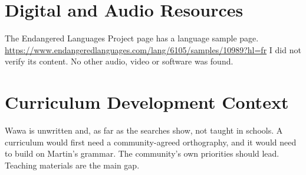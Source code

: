 \documentclass[12pt]{article}
\begin{document}
\section{Digital and Audio Resources}
The Endangered Languages Project page has a language sample page. \url{https://www.endangeredlanguages.com/lang/6105/samples/10989?hl=fr} I did not verify its content. No other audio, video or software was found.

\section{Curriculum Development Context}
Wawa is unwritten and, as far as the searches show, not taught in schools. A curriculum would first need a community-agreed orthography, and it would need to build on Martin's grammar. The community's own priorities should lead. Teaching materials are the main gap.
\end{document}
